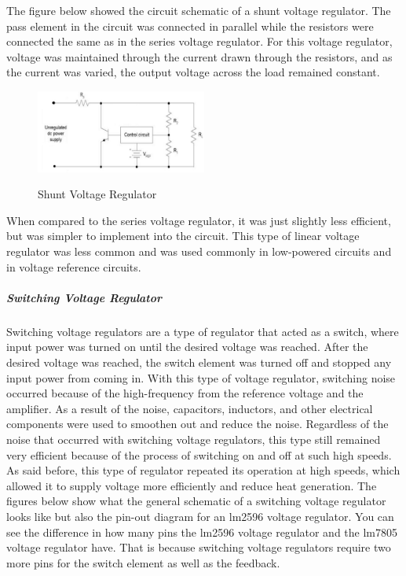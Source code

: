 The figure below showed the circuit schematic of a shunt voltage regulator. The pass element in the circuit was connected in parallel while the resistors were connected the same as in the series voltage regulator. For this voltage regulator, voltage was maintained through the current drawn through the resistors, and as the current was varied, the output voltage across the load remained constant.
\begin{figure}[H]
    \caption{Shunt Voltage Regulator}
    \centering
    \includegraphics[width=0.5\textwidth]{images/Shunt_Voltage_Regulator.png}
    \label{fig:shunt-voltage-regulator}
\end{figure}
When compared to the series voltage regulator, it was just slightly less efficient, but was simpler to implement into the circuit. This type of linear voltage regulator was less common and was used commonly in low-powered circuits and in voltage reference circuits.
\subparagraph{Switching Voltage Regulator}
Switching voltage regulators are a type of regulator that acted as a switch, where input power was turned on until the desired voltage was reached. After the desired voltage was reached, the switch element was turned off and stopped any input power from coming in. With this type of voltage regulator, switching noise occurred because of the high-frequency from the reference voltage and the amplifier. As a result of the noise, capacitors, inductors, and other electrical components were used to smoothen out and reduce the noise. Regardless of the noise that occurred with switching voltage regulators, this type still remained very efficient because of the process of switching on and off at such high speeds. As said before, this type of regulator repeated its operation at high speeds, which allowed it to supply voltage more efficiently and reduce heat generation. The figures below show what the general schematic of a switching voltage regulator looks like but also the pin-out diagram for an lm2596 voltage regulator. You can see the difference in how many pins the lm2596 voltage regulator and the lm7805 voltage regulator have. That is because switching voltage regulators require two more pins for the switch element as well as the feedback.
